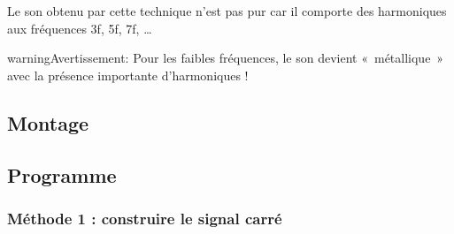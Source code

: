 \documentclass[a4paper,10pt,french]{book}
\let\sphinxpxdimen\pdfpxdimen\else\newdimen\sphinxpxdimen
\begin{document}
Le son obtenu par cette technique n’est pas pur car il comporte des harmoniques aux fréquences 3f, 5f, 7f, …

\begin{sphinxadmonition}{warning}{Avertissement:}
Pour les faibles fréquences, le son devient « métallique » avec la présence importante d’harmoniques !
\end{sphinxadmonition}


\subsection{Montage}
\label{\detokenize{4_lycee/2_seconde_emettre_son:montage}}
\noindent{\hspace*{\fill}\sphinxincludegraphics[width=308.40000\sphinxpxdimen,height=250.80000\sphinxpxdimen]{{Son_Piezo}.png}\hspace*{\fill}}


\subsection{Programme}
\label{\detokenize{4_lycee/2_seconde_emettre_son:programme}}

\subsubsection{Méthode 1 : construire le signal carré}
\label{\detokenize{4_lycee/2_seconde_emettre_son:methode-1-construire-le-signal-carre}}
\begin{sphinxVerbatim}[commandchars=\\\{\}]
      


 
 

 
     

 
\end{sphinxVerbatim}
\end{document}
